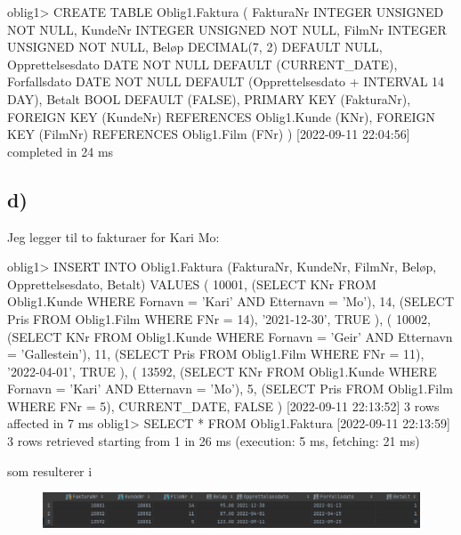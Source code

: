 \documentclass[%
notitlepage,
 amsmath,amssymb,
 aps,
rmp,
]{revtex4-2}  %
\begin{document}
\begin{sql}
oblig1> CREATE TABLE Oblig1.Faktura
        (
            FakturaNr        INTEGER UNSIGNED NOT NULL,
            KundeNr          INTEGER UNSIGNED NOT NULL,
            FilmNr           INTEGER UNSIGNED NOT NULL,
            Beløp            DECIMAL(7, 2)             DEFAULT NULL,
            Opprettelsesdato DATE             NOT NULL DEFAULT (CURRENT_DATE),
            Forfallsdato     DATE             NOT NULL DEFAULT (Opprettelsesdato + INTERVAL 14 DAY),
            Betalt BOOL DEFAULT (FALSE),
            PRIMARY KEY (FakturaNr),
            FOREIGN KEY (KundeNr) REFERENCES Oblig1.Kunde (KNr),
            FOREIGN KEY (FilmNr) REFERENCES Oblig1.Film (FNr)
        )
[2022-09-11 22:04:56] completed in 24 ms
\end{sql}

\newpage
\subsection*{d)}
Jeg legger til to fakturaer for Kari Mo:
\begin{sql}
oblig1> INSERT INTO Oblig1.Faktura (FakturaNr, KundeNr, FilmNr, Beløp, Opprettelsesdato, Betalt)
            VALUES
                (
                 10001,
                 (SELECT KNr FROM Oblig1.Kunde WHERE Fornavn = 'Kari' AND Etternavn = 'Mo'),
                 14,
                 (SELECT Pris FROM Oblig1.Film WHERE FNr = 14),
                 '2021-12-30',
                 TRUE
                ),
                (
                 10002,
                 (SELECT KNr FROM Oblig1.Kunde WHERE Fornavn = 'Geir' AND Etternavn = 'Gallestein'),
                 11,
                 (SELECT Pris FROM Oblig1.Film WHERE FNr = 11),
                 '2022-04-01',
                 TRUE
                ),
                (
                 13592,
                 (SELECT KNr FROM Oblig1.Kunde WHERE Fornavn = 'Kari' AND Etternavn = 'Mo'),
                 5,
                 (SELECT Pris FROM Oblig1.Film WHERE FNr = 5),
                 CURRENT_DATE,
                 FALSE
                )
[2022-09-11 22:13:52] 3 rows affected in 7 ms
oblig1> SELECT *
        FROM Oblig1.Faktura
[2022-09-11 22:13:59] 3 rows retrieved starting from 1 in 26 ms (execution: 5 ms, fetching: 21 ms)
\end{sql}
som resulterer i
\begin{figure}[H]
\centering\includegraphics[width=\columnwidth]{op2d.png}
\end{figure}
\end{document}
